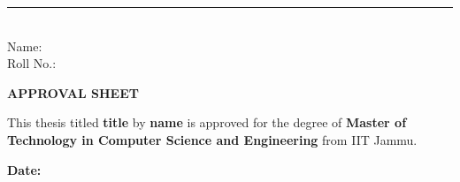 \vspace{1cm} \hfill
\begin{flushright}
	\rule{7.0cm}{0.5pt} \\
	\hspace{2pt}Name: \\
	\hspace{2pt}Roll No.: 
\end{flushright}
\newpage
\thispagestyle{empty}
\cleardoublepage
\newpage
\thispagestyle{plain}
\begin{center}
	\textbf{\large APPROVAL SHEET}
\end{center}

\vspace{1.5cm}

\noindent This thesis titled \textbf{title} by \textbf{name} is approved for the degree of \textbf{Master of Technology in Computer Science and Engineering} from IIT Jammu.

\vspace{1.5cm}


\textbf{Date: } 


